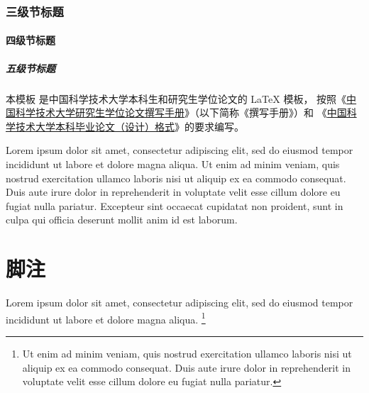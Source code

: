 \subsubsection{三级节标题}

\paragraph{四级节标题}

\subparagraph{五级节标题}

本模板  是中国科学技术大学本科生和研究生学位论文的 \LaTeX{}
模板， 按照《\href{https://gradschool.ustc.edu.cn/static/upload/article/picture/ce3b02e5f0274c90b9331ef50ae1ac26.pdf}
{中国科学技术大学研究生学位论文撰写手册}》（以下简称《撰写手册》）和
《\href{https://www.teach.ustc.edu.cn/?attachment_id=13867}
{中国科学技术大学本科毕业论文（设计）格式}》的要求编写。

Lorem ipsum dolor sit amet, consectetur adipiscing elit, sed do eiusmod tempor
incididunt ut labore et dolore magna aliqua.
Ut enim ad minim veniam, quis nostrud exercitation ullamco laboris nisi ut
aliquip ex ea commodo consequat.
Duis aute irure dolor in reprehenderit in voluptate velit esse cillum dolore eu
fugiat nulla pariatur.
Excepteur sint occaecat cupidatat non proident, sunt in culpa qui officia
deserunt mollit anim id est laborum.



\section{脚注}

Lorem ipsum dolor sit amet, consectetur adipiscing elit, sed do eiusmod tempor
incididunt ut labore et dolore magna aliqua.
\footnote{Ut enim ad minim veniam, quis nostrud exercitation ullamco laboris
  nisi ut aliquip ex ea commodo consequat.
  Duis aute irure dolor in reprehenderit in voluptate velit esse cillum dolore
  eu fugiat nulla pariatur.}
